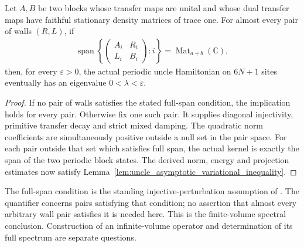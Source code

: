 \begin{theorem}
    \label{thm:uncle_generic_finite_volume_gaplessness}
    \leanok
    Let $A,B$ be two blocks whose transfer maps are unital and whose
    dual transfer maps have faithful stationary density matrices of
    trace one. For almost every pair of walls $(R,L)$, if
    \begin{align}
        \operatorname{span}\left\{
        \begin{pmatrix}A_i&R_i\\L_i&B_i\end{pmatrix}:i
        \right\}
        =\operatorname{Mat}_{a+b}(\mathbb C),
    \end{align}
    then, for every $\varepsilon>0$, the actual periodic uncle
    Hamiltonian on $6N+1$ sites eventually has an eigenvalue
    $0<\lambda<\varepsilon$.
\end{theorem}
\begin{proof}
    \leanok
    If no pair of walls satisfies the stated full-span condition,
    the implication holds for every pair. Otherwise fix one such
    pair. It supplies diagonal injectivity, primitive transfer decay
    and strict mixed damping. The quadratic norm coefficients are
    simultaneously positive outside a null set in the pair space.
    For each pair outside that set which satisfies full span, the
    actual kernel is exactly the span of the two periodic block
    states. The derived norm, energy and projection estimates now
    satisfy Lemma~\ref{lem:uncle_asymptotic_variational_inequality}.
\end{proof}

The full-span condition is the standing injective-perturbation assumption
of \cite[proof of the gaplessness theorem]{FernandezGonzalez2015Uncle}.
The quantifier concerns pairs satisfying that condition; no assertion
that almost every arbitrary wall pair satisfies it is needed here.
This is the finite-volume spectral conclusion. Construction of an
infinite-volume operator and determination of its full spectrum are
separate questions.
